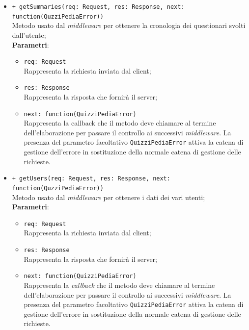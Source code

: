 \begin{itemize}
\begin{itemize}
		 \item
		  \texttt{+ getSummaries(req: Request, res: Response, next: function(QuzziPediaError))} \\
		Metodo usato dal \textit{middleware} per ottenere la cronologia dei questionari svolti dall'utente; \\
		\textbf{Parametri}:
		 \begin{itemize}
		  \item
			\texttt{req: Request} \\
			Rappresenta la richiesta inviata dal client;
		  \item
			\texttt{res: Response} \\
			Rappresenta la risposta che fornirà il server;
		  \item
		    \texttt{next: function(QuizziPediaError)} \\
			Rappresenta la callback che il metodo deve chiamare al termine dell'elaborazione per passare il controllo ai successivi \textit{middleware}. La presenza del parametro facoltativo \texttt{QuizziPediaError} attiva la catena di gestione dell'errore in sostituzione della normale catena di gestione delle richieste.
		 \end{itemize}
		  \item
		 	 \texttt{+ getUsers(req: Request, res: Response, next: function(QuzziPediaError))} \\
		Metodo usato dal \textit{middleware} per ottenere i dati dei vari utenti; \\
		\textbf{Parametri}:
		 \begin{itemize}
		  \item
			\texttt{req: Request} \\
			Rappresenta la richiesta inviata dal client;
		  \item
			\texttt{res: Response} \\
			Rappresenta la risposta che fornirà il server;
		  \item
		    \texttt{next: function(QuizziPediaError)} \\
			Rappresenta la \textit{callback} che il metodo deve chiamare al termine dell'elaborazione per passare il controllo ai successivi \textit{middleware}. La presenza del parametro facoltativo \texttt{QuizziPediaError} attiva la catena di gestione dell'errore in sostituzione della normale catena di gestione delle richieste.
		 \end{itemize}
	\end{itemize}	 
\end{itemize}
